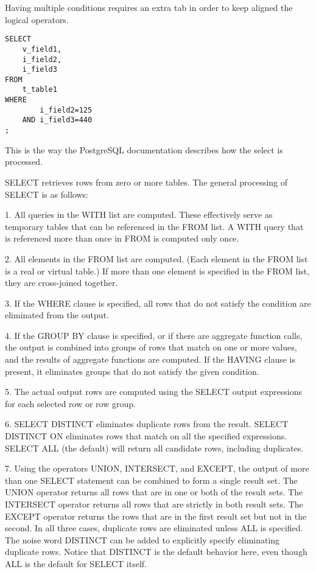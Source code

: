 \begin{itemize}
Having multiple conditions requires an extra tab in order to keep aligned the logical operators.

\begin{lstlisting}[style=pgsql]
SELECT 
	v_field1,
	i_field2,
	i_field3 
FROM 
	t_table1 
WHERE 
		i_field2=125
	AND	i_field3=440
;
\end{lstlisting}


This is the way the PostgreSQL documentation describes how the select is processed.

\begin{smallverbatim}
 

SELECT retrieves rows from zero or more tables. The general processing of SELECT is as follows:

1. All queries in the WITH list are computed. 
These effectively serve as temporary tables that can be referenced in the FROM list. 
A WITH query that is referenced more than once in FROM is computed only once. 


2. All elements in the FROM list are computed. 
(Each element in the FROM list is a real or virtual table.) 
If more than one element is specified in the FROM list, they are cross-joined together.


3. If the WHERE clause is specified, all rows that do not satisfy the condition 
are eliminated from the output. 


4. If the GROUP BY clause is specified, or if there are aggregate function calls, 
the output is combined into groups of rows that match on one or more values, 
and the results of aggregate functions are computed. 
If the HAVING clause is present, it eliminates groups that do not satisfy the 
given condition. 


5. The actual output rows are computed using the SELECT output expressions 
for each selected row or row group. 


6. SELECT DISTINCT eliminates duplicate rows from the result. 
SELECT DISTINCT ON eliminates rows that match on all the specified expressions. 
SELECT ALL (the default) will return all candidate rows, including duplicates. 


7. Using the operators UNION, INTERSECT, and EXCEPT, the output of more than one 
SELECT statement can be combined to form a single result set. 
The UNION operator returns all rows that are in one or both of the result sets. 
The INTERSECT operator returns all rows that are strictly in both result sets. 
The EXCEPT operator returns the rows that are in the first result set but not in the second. 
In all three cases, duplicate rows are eliminated unless ALL is specified. 
The noise word DISTINCT can be added to explicitly specify eliminating duplicate rows. 
Notice that DISTINCT is the default behavior here, even though ALL is the default for SELECT itself. 



\end{smallverbatim}
\end{itemize}
